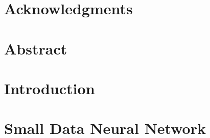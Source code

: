 \documentclass[11pt]{book}
\renewcommand{\baselinestretch}{1.2}
\begin{document}

 

 


\newpage
 \thispagestyle{empty}
\renewcommand{\thesisdedication}{{\large Copyright \copyright~~ The LNMIIT 2017\\}{\large All Rights Reserved\\}}
\thesisdedicationpage



\newpage
\thispagestyle{empty}
\renewcommand{\thesisdedication}{\large Dedicated to our amazing Faculty and supportive Seniors and Peers }
\thesisdedicationpage


\chapter*{Acknowledgments}
\label{ch:ack}


\chapter*{Abstract}
\label{ch:ack}



\tableofcontents

\chapter{Introduction}
\label{ch:intro}


\chapter{Small Data Neural Network}
\label{ch:reversible}


%
%
%
%
%
\end{document}
